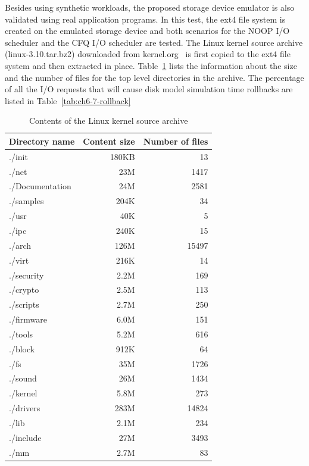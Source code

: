 Besides using synthetic workloads, the proposed storage device emulator is also validated using real application programs. In this test, the ext4 file system is created on the emulated storage device and both scenarios for the NOOP I/O scheduler and the CFQ I/O scheduler are tested. The Linux kernel source archive (linux-3.10.tar.bz2) downloaded from kernel.org~\cite{Kernel:2013:3.10source} is first copied to the ext4 file system and then extracted in place. Table~\ref{tab:ch6-linux-archive} lists the information about the size and the number of files for the top level directories in the archive. The percentage of all the I/O requests that will cause disk model simulation time rollbacks are listed in Table~\ref{tab:ch6-7-rollback}  


\begin{table}[htbp]%
	\small
	\begin{center}
		\caption{Contents of the Linux kernel source archive}\label{tab:ch6-linux-archive}
		\noindent\begin{tabular}{lrr}
		\toprule

		Directory name & Content size & Number of files \\
		\midrule
		./init & 180KB & 13 \\
		./net & 23M & 1417 \\
		./Documentation & 24M & 2581 \\
		./samples & 204K & 34 \\
		./usr & 40K & 5 \\
		./ipc & 240K & 15 \\
		./arch & 126M & 15497 \\
		./virt & 216K & 14 \\
		./security & 2.2M & 169 \\
		./crypto & 2.5M & 113 \\
		./scripts & 2.7M & 250 \\
		./firmware & 6.0M & 151 \\
		./tools & 5.2M & 616 \\
		./block & 912K & 64 \\
		./fs & 35M & 1726 \\
		./sound & 26M & 1434 \\
		./kernel & 5.8M & 273 \\
		./drivers & 283M & 14824 \\
		./lib & 2.1M & 234 \\
		./include & 27M & 3493 \\
		./mm & 2.7M & 83 \\		
		\bottomrule
		\end{tabular}
	\end{center}
\end{table}%


